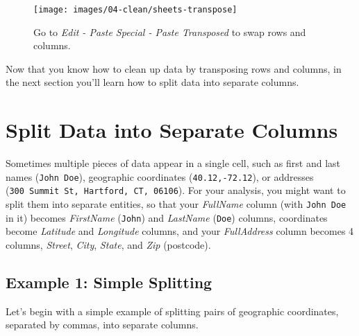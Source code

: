\documentclass[
  english,
]{book}
\begin{document}
\begin{figure}
\texttt{[image: images/04-clean/sheets-transpose]} \caption{Go to \emph{Edit - Paste Special - Paste Transposed} to swap rows and columns.}\label{fig:sheets-transpose}
\end{figure}

Now that you know how to clean up data by transposing rows and columns, in the next section you'll learn how to split data into separate columns.

\hypertarget{split-data}{%
\section*{Split Data into Separate Columns}\label{split-data}}

Sometimes multiple pieces of data appear in a single cell,
such as first and last names (\texttt{John\ Doe}), geographic coordinates (\texttt{40.12,-72.12}),
or addresses (\texttt{300\ Summit\ St,\ Hartford,\ CT,\ 06106}). For your analysis,
you might want to split them into separate entities, so that your \emph{FullName}
column (with \texttt{John\ Doe} in it) becomes \emph{FirstName} (\texttt{John}) and \emph{LastName} (\texttt{Doe}) columns,
coordinates become \emph{Latitude} and \emph{Longitude} columns, and your \emph{FullAddress} column becomes
4 columns, \emph{Street}, \emph{City}, \emph{State}, and \emph{Zip} (postcode).

\hypertarget{example-1-simple-splitting}{%
\subsection*{Example 1: Simple Splitting}\label{example-1-simple-splitting}}

Let's begin with a simple example of splitting pairs of geographic coordinates, separated by commas, into separate columns.
\end{document}
